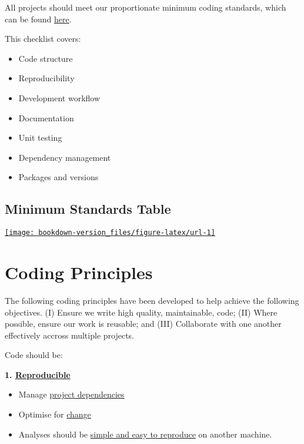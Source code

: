 \documentclass[]{book}
\providecommand{\tightlist}{%
  \setlength{\itemsep}{0pt}\setlength{\parskip}{0pt}}
\begin{document}
All projects should meet our proportionate minimum coding standards, which can be found \href{https://moj-analytical-services.github.io/our-coding-standards/web/}{here}.

This checklist covers:

\begin{itemize}
\tightlist
\item
  Code structure\\
\item
  Reproducibility\\
\item
  Development workflow\\
\item
  Documentation\\
\item
  Unit testing\\
\item
  Dependency management\\
\item
  Packages and versions
\end{itemize}

\hypertarget{mcstable}{%
\section{Minimum Standards Table}\label{mcstable}}

\href{https://moj-analytical-services.github.io/our-coding-standards/web/}{\texttt{[image: bookdown-version\_files/figure-latex/url-1]} }

\hypertarget{principles}{%
\chapter{Coding Principles}\label{principles}}

The following coding principles have been developed to help achieve the following objectives. (I) Ensure we write high quality, maintainable, code; (II) Where possible, ensure our work is reusable; and (III) Collaborate with one another effectively accross multiple projects.

Code should be:

\textbf{1. \protect\hyperlink{reproduce}{Reproducible}}

\begin{itemize}
\tightlist
\item
  Manage \protect\hyperlink{projdep}{project dependencies}
\item
  Optimise for \protect\hyperlink{change}{change}\\
\item
  Analyses should be \protect\hyperlink{githash}{simple and easy to reproduce} on another machine.
\end{itemize}
\end{document}
